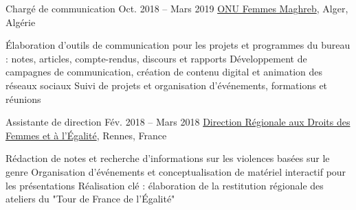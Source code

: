 \begin{joblist}[13.2][7.8][3.4]

\item[Chargé de communication]{Oct. 2018 -- Mars 2019 }     
	{
	\href{http://maghreb.unwomen.org/fr}{ONU Femmes Maghreb}, Alger, Algérie
	}     
	{
		\normalsize{
		\vspace{-0.5cm}
		\begin{itemize}
			  \iftbftiny \setlength\itemsep{-3pt} \fi
			  \cvitem[\checkmark] Élaboration d'outils de communication pour les projets et programmes du bureau : notes, articles, compte-rendus, discours et rapports  
              \cvitem[\checkmark] Développement de campagnes de communication, création de contenu digital et animation des réseaux sociaux
			  \cvitem[\checkmark] Suivi de projets et organisation d'événements, formations et réunions 
			  
			  
			  
		\end{itemize}      
		}
	}


\item[Assistante de direction]{Fév. 2018 -- Mars 2018 }     
	{
	\href{https://www.egalite-femmes-hommes.gouv.fr/le-secretariat-d-etat/organisation-du-ministere/services-territoriaux/annuaire-des-equipes-regionales-et-departementales/}{Direction Régionale aux Droits des Femmes et à l'Égalité}, Rennes, France
	}     
	{
		\normalsize{
		\iftbftiny \vspace{-0.5cm} \fi
		\begin{itemize}
			  \iftbftiny \setlength\itemsep{-3pt} \fi
			  \cvitem[\checkmark] Rédaction de notes et recherche d'informations sur les violences basées sur le genre
			  \cvitem[\checkmark] Organisation d'événements et conceptualisation de matériel interactif pour les présentations
              \cvitem[\checkmark] Réalisation clé : élaboration de la restitution régionale des ateliers du "Tour de France de l’Égalité"                                                            
			 

\end{itemize}}}
\end{joblist}
